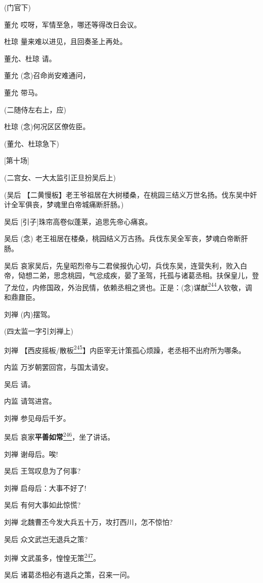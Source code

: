 (门官下)

董允 哎呀，军情至急，哪还等得改日会议。

杜琼 量来难以进见，且回奏圣上再处。

董允、杜琼 请。

董允 (念)召命尚安难通问，

董允 带马。

(二随侍左右上，应)

杜琼 (念)何况区区僚佐臣。

(董允、杜琼急下)

{[}第十场{]}

(二宫女、一大太监引正旦扮吴后上)

(吴后
【二黄慢板】老王爷祖居在大树楼桑，在桃园三结义万世名扬。伐东吴中奸计全军俱丧，梦魂里白帝城痛断肝肠。)

吴后 {[}引子{]}珠帘高卷似蓬莱，追思先帝心痛哀。

吴后 (念)
老王祖居在楼桑，桃园结义万古扬。兵伐东吴全军丧，梦魂白帝断肝肠。

吴后
哀家吴后，先皇昭烈帝与二君侯报仇心切，兵伐东吴，连营失利，败入白帝，恸想二弟，思念桃园，气忿成疾，晏了圣驾，托孤与诸葛丞相。扶保皇儿，登了龙位，内修国政，外治民情，依赖丞相之贤也。正是：(念)谋猷\protect\hyperlink{fn244}{\textsuperscript{244}}人钦敬，调和鼎鼐臣。

刘禅 (内)摆驾。

(四太监一字引刘禅上)

刘禅
【西皮摇板/散板\protect\hyperlink{fn245}{\textsuperscript{245}}】内臣宰无计策孤心烦躁，老丞相不出府所为哪条。

内监 万岁朝罢回宫，与国太请安。

吴后 请。

内监 请驾进宫。

刘禅 参见母后千岁。

吴后
哀家\textbf{平善如常}\protect\hyperlink{fn246}{\textsuperscript{246}}，坐了讲话。

刘禅 谢母后。唉!

吴后 王驾叹息为了何事?

刘禅 启母后：大事不好了!

吴后 有何大事如此惊慌?

刘禅 北魏曹丕今发大兵五十万，攻打西川，怎不惊怕?

吴后 众文武岂无退兵之策?

刘禅
文武虽多，惶惶无策\protect\hyperlink{fn247}{\textsuperscript{247}}。

吴后 诸葛丞相必有退兵之策，召来一问。

